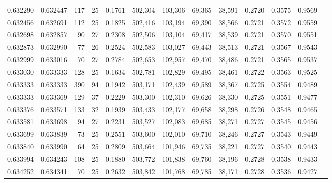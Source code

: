 \begin{tabular}{rrrrrrrrrrrrr}
0.632290 & 0.632447 &    117 &    25 &                                     0.1761 & 502,304 & 103,306 &  69,365 &  38,591 & 0.2720 & 0.3575 & 0.9569 \\
0.632456 & 0.632691 &    112 &    25 &                                     0.1825 & 502,416 & 103,194 &  69,390 &  38,566 & 0.2721 & 0.3572 & 0.9559 \\
0.632698 & 0.632857 &     90 &    27 &                                     0.2308 & 502,506 & 103,104 &  69,417 &  38,539 & 0.2721 & 0.3570 & 0.9551 \\
0.632873 & 0.632990 &     77 &    26 &                                     0.2524 & 502,583 & 103,027 &  69,443 &  38,513 & 0.2721 & 0.3567 & 0.9543 \\
0.632999 & 0.633016 &     70 &    27 &                                     0.2784 & 502,653 & 102,957 &  69,470 &  38,486 & 0.2721 & 0.3565 & 0.9537 \\
0.633030 & 0.633333 &    128 &    25 &                                     0.1634 & 502,781 & 102,829 &  69,495 &  38,461 & 0.2722 & 0.3563 & 0.9525 \\
0.633333 & 0.633333 &    390 &    94 &                                     0.1942 & 503,171 & 102,439 &  69,589 &  38,367 & 0.2725 & 0.3554 & 0.9489 \\
0.633333 & 0.633369 &    129 &    37 &                                     0.2229 & 503,300 & 102,310 &  69,626 &  38,330 & 0.2725 & 0.3551 & 0.9477 \\
0.633376 & 0.633571 &    133 &    32 &                                     0.1939 & 503,433 & 102,177 &  69,658 &  38,298 & 0.2726 & 0.3548 & 0.9465 \\
0.633581 & 0.633698 &     94 &    27 &                                     0.2231 & 503,527 & 102,083 &  69,685 &  38,271 & 0.2727 & 0.3545 & 0.9456 \\
0.633699 & 0.633839 &     73 &    25 &                                     0.2551 & 503,600 & 102,010 &  69,710 &  38,246 & 0.2727 & 0.3543 & 0.9449 \\
0.633840 & 0.633990 &     64 &    25 &                                     0.2809 & 503,664 & 101,946 &  69,735 &  38,221 & 0.2727 & 0.3540 & 0.9443 \\
0.633994 & 0.634243 &    108 &    25 &                                     0.1880 & 503,772 & 101,838 &  69,760 &  38,196 & 0.2728 & 0.3538 & 0.9433 \\
0.634252 & 0.634341 &     70 &    25 &                                     0.2632 & 503,842 & 101,768 &  69,785 &  38,171 & 0.2728 & 0.3536 & 0.9427 \\

\end{tabular}
